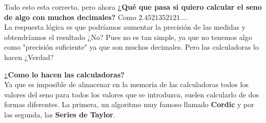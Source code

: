 \documentclass[12pt, a4paper, oneside]{article}
\begin{document}
Todo esto esta correcto, pero ahora
\textbf{¿Qué que pasa si quiero calcular el seno de algo
con muchos decimales?} Como $2.4521352121....$\\

La respuesta lógica es que podríamos aumentar la precisión de las
medidas y obtendríamos el resultado ¿No? Pues no es tan simple, ya 
que no tenemos algo como "precisión suficiente" ya que son muchos
decimales. Pero las calculadoras lo hacen ¿Verdad?\\
\par

\textbf{¿Como lo hacen las calculadoras?}\\
Ya que es imposible de almacenar en la memoria de las calculadoras todos
los valores del seno para todos los valores que se introduzca, suelen
calcularlo de dos formas diferentes. La primera, un algoritmo muy famoso
llamado \textbf{Cordic} y por las segunda, las \textbf{Series de Taylor}.
\par
\end{document}
